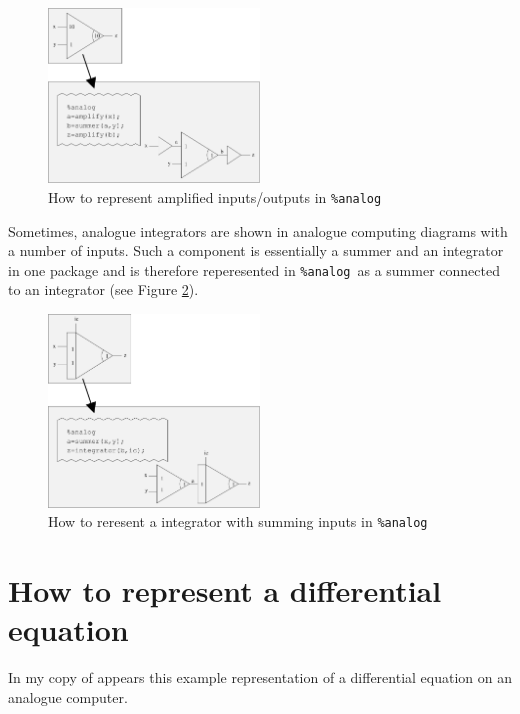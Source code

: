 \documentclass[a4paper,10pt]{article}
\newcommand{\analog}{\texttt{\%analog}}
\begin{document}
\begin{figure}[h]
\center
\label{amplifyExample}
\includegraphics[width=0.5\textwidth]{amplifyExample}
\caption{How to represent amplified inputs/outputs in \analog}
\end{figure}




Sometimes, analogue integrators are shown in analogue computing diagrams with a number of inputs. Such a component is essentially a summer and an integrator in one package and is therefore reperesented in \analog\ as a summer connected to an integrator (see Figure \ref{integratorSummer}).

\begin{figure}[h]
\center
\label{integratorSummer}
\includegraphics[width=0.5\textwidth]{integratorSummer}
\caption{How to reresent a integrator with summing inputs in \analog}
\end{figure}



\section{How to represent a differential equation}

In my copy of \cite{charlesworth} appears this example representation of 
a differential equation on an analogue computer.
\end{document}
